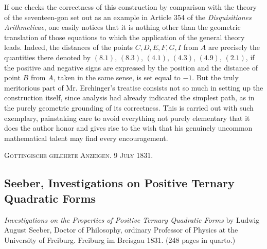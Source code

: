 \documentclass[12pt]{article}
\begin{document}
If one checks the correctness of this construction by comparison with the theory of the seventeen-gon set out as an example in Article 354 of the \textit{Disquisitiones Arithmeticae}, one easily notices that it is nothing other than the geometric translation of those equations to which the application of the general theory leads. Indeed, the distances of the points $C,D,E,F,G,I$ from $A$ are precisely the quantities there denoted by $(8.1)$, $(8.3)$, $(4.1)$, $(4.3)$, $(4.9)$, $(2.1)$, if the positive and negative signs are expressed by the position and the distance of point $B$ from $A$, taken in the same sense, is set equal to $-1$. But the truly meritorious part of Mr. Erchinger's treatise consists not so much in setting up the construction itself, since analysis had already indicated the simplest path, as in the purely geometric grounding of its correctness. This is carried out with such exemplary, painstaking care to avoid everything not purely elementary that it does the author honor and gives rise to the wish that his genuinely uncommon mathematical talent may find every encouragement.

\begin{center}
\textsc{Göttingische gelehrte Anzeigen. 9 July 1831.}
\end{center}

\subsection*{Seeber, Investigations on Positive Ternary Quadratic Forms}

\begin{center}
\textit{Investigations on the Properties of Positive Ternary Quadratic Forms} by Ludwig August Seeber, Doctor of Philosophy, ordinary Professor of Physics at the University of Freiburg. Freiburg im Breisgau 1831. (248 pages in quarto.)
\end{center}
\end{document}
